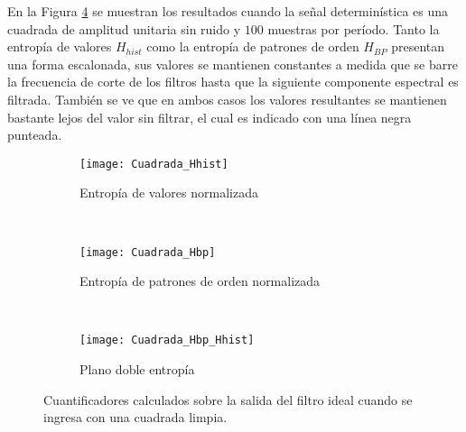 En la Figura \ref{fig:Cuadrada} se muestran los resultados cuando la señal determinística es una cuadrada de amplitud unitaria sin ruido y $100$ muestras por período.
Tanto la entropía de valores $H_{hist}$ como la entropía de patrones de orden $H_{BP}$ presentan una forma escalonada, sus valores se mantienen constantes a medida que se barre la frecuencia de corte de los filtros hasta que la siguiente componente espectral es filtrada.
También se ve que en ambos casos los valores resultantes se mantienen bastante lejos del valor sin filtrar, el cual es indicado con una línea negra punteada.
%
\begin{figure}[h]
    \centering
    \begin{subfigure}[t]{.49\textwidth}
        \texttt{[image: Cuadrada\_Hhist]}
        \caption{Entropía de valores normalizada}
        \label{subfig:Cuadrada_Hhist}
    \end{subfigure}
    ~ %
    \begin{subfigure}[t]{.49\textwidth}
        \texttt{[image: Cuadrada\_Hbp]}
        \caption{Entropía de patrones de orden normalizada}
        \label{subfig:Cuadrada_Hbp}
    \end{subfigure}
    ~ %
    \begin{subfigure}[t]{.49\textwidth}
        \texttt{[image: Cuadrada\_Hbp\_Hhist]}
        \caption{Plano doble entropía}
        \label{subfig:Cuadrada_HbpHhist}
    \end{subfigure}
    \caption{Cuantificadores calculados sobre la salida del filtro ideal cuando se ingresa con una cuadrada limpia.}\label{fig:Cuadrada}
\end{figure}

